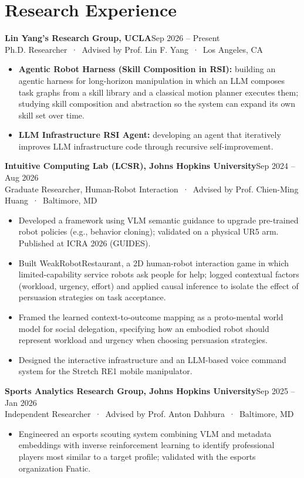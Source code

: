 \documentclass[10pt,letterpaper]{article}
\newcommand{\entry}[4]{\noindent\textbf{#1}\hfill {\color{muted}\small #2}\\ {\color{muted}#3 \,·\, #4}}
\begin{document}
\section{Research Experience}
\entry{Lin Yang's Research Group, UCLA}{Sep 2026 -- Present}{Ph.D. Researcher \,·\, Advised by Prof. Lin F. Yang}{Los Angeles, CA}
\begin{itemize}
\item \textbf{Agentic Robot Harness (Skill Composition in RSI):} building an agentic harness for long-horizon manipulation in which an LLM composes task graphs from a skill library and a classical motion planner executes them; studying skill composition and abstraction so the system can expand its own skill set over time.
\item \textbf{LLM Infrastructure RSI Agent:} developing an agent that iteratively improves LLM infrastructure code through recursive self-improvement.
\end{itemize}

\entry{Intuitive Computing Lab (LCSR), Johns Hopkins University}{Sep 2024 -- Aug 2026}{Graduate Researcher, Human-Robot Interaction \,·\, Advised by Prof. Chien-Ming Huang}{Baltimore, MD}
\begin{itemize}
\item Developed a framework using VLM semantic guidance to upgrade pre-trained robot policies (e.g., behavior cloning); validated on a physical UR5 arm. Published at ICRA 2026 (GUIDES).
\item Built WeakRobotRestaurant, a 2D human-robot interaction game in which limited-capability service robots ask people for help; logged contextual factors (workload, urgency, effort) and applied causal inference to isolate the effect of persuasion strategies on task acceptance.
\item Framed the learned context-to-outcome mapping as a proto-mental world model for social delegation, specifying how an embodied robot should represent workload and urgency when choosing persuasion strategies.
\item Designed the interactive infrastructure and an LLM-based voice command system for the Stretch RE1 mobile manipulator.
\end{itemize}

\entry{Sports Analytics Research Group, Johns Hopkins University}{Sep 2025 -- Jan 2026}{Independent Researcher \,·\, Advised by Prof. Anton Dahbura}{Baltimore, MD}
\begin{itemize}
\item Engineered an esports scouting system combining VLM and metadata embeddings with inverse reinforcement learning to identify professional players most similar to a target profile; validated with the esports organization Fnatic.
\end{itemize}
\end{document}
